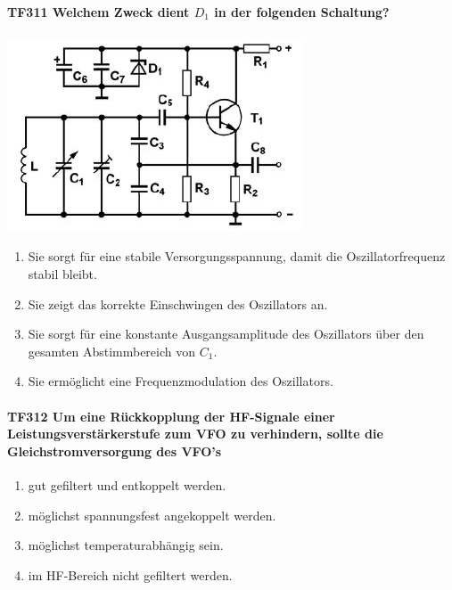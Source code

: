 \documentclass[8pt]{article}
\begin{document}
\paragraph*{TF311 Welchem Zweck dient $D_{1}$ in der folgenden Schaltung?}
\begin{center}
	\begin{minipage}{\linewidth}
		\centering
		\includegraphics[scale=1.0]{pics/tf311_a.jpg}
	\end{minipage}
\end{center}
\begin{enumerate}[nolistsep,label=\Alph*]
\item Sie sorgt für eine stabile Versorgungsspannung, damit die Oszillatorfrequenz stabil bleibt.
\item Sie zeigt das korrekte Einschwingen des Oszillators an.
\item Sie sorgt für eine konstante Ausgangsamplitude des Oszillators über den gesamten Abstimmbereich von $C_{1}$. 
\item Sie ermöglicht eine Frequenzmodulation des Oszillators.
\end{enumerate}

\paragraph*{TF312 Um eine Rückkopplung der HF-Signale einer Leistungsverstärkerstufe zum VFO zu verhindern, sollte die Gleichstromversorgung des VFO's}
\begin{enumerate}[nolistsep,label=\Alph*]
\item gut gefiltert und entkoppelt werden.
\item möglichst spannungsfest angekoppelt werden.
\item möglichst temperaturabhängig sein.
\item im HF-Bereich nicht gefiltert werden.
\end{enumerate}
\end{document}
